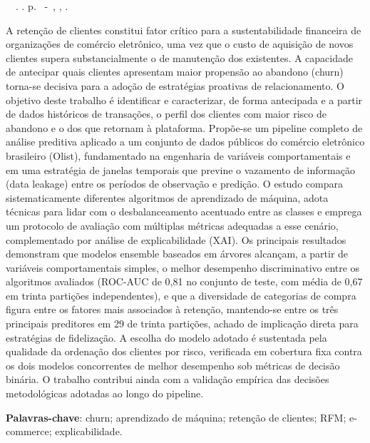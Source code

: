 \setlength{\absparsep}{18pt} %
\begin{resumo}
	\begin{flushleft}
			\setlength{\absparsep}{0pt}
			\SingleSpacing
			\imprimirautorabr~~\textbf{\imprimirtituloresumo}.	\imprimirdata. \pageref{LastPage} p.
			\imprimirtipotrabalho~-~\imprimirinstituicao, \imprimirlocal, \imprimirdata.
	\end{flushleft}
\OnehalfSpacing

A retenção de clientes constitui fator crítico para a sustentabilidade financeira de organizações de comércio eletrônico, uma vez que o custo de aquisição de novos clientes supera substancialmente o de manutenção dos existentes. A capacidade de antecipar quais clientes apresentam maior propensão ao abandono (churn) torna-se decisiva para a adoção de estratégias proativas de relacionamento. O objetivo deste trabalho é identificar e caracterizar, de forma antecipada e a partir de dados históricos de transações, o perfil dos clientes com maior risco de abandono e o dos que retornam à plataforma. Propõe-se um pipeline completo de análise preditiva aplicado a um conjunto de dados públicos do comércio eletrônico brasileiro (Olist), fundamentado na engenharia de variáveis comportamentais e em uma estratégia de janelas temporais que previne o vazamento de informação (data leakage) entre os períodos de observação e predição. O estudo compara sistematicamente diferentes algoritmos de aprendizado de máquina, adota técnicas para lidar com o desbalanceamento acentuado entre as classes e emprega um protocolo de avaliação com múltiplas métricas adequadas a esse cenário, complementado por análise de explicabilidade (XAI). Os principais resultados demonstram que modelos ensemble baseados em árvores alcançam, a partir de variáveis comportamentais simples, o melhor desempenho discriminativo entre os algoritmos avaliados (ROC-AUC de 0,81 no conjunto de teste, com média de 0,67 em trinta partições independentes), e que a diversidade de categorias de compra figura entre os fatores mais associados à retenção, mantendo-se entre os três principais preditores em 29 de trinta partições, achado de implicação direta para estratégias de fidelização. A escolha do modelo adotado é sustentada pela qualidade da ordenação dos clientes por risco, verificada em cobertura fixa contra os dois modelos concorrentes de melhor desempenho sob métricas de decisão binária. O trabalho contribui ainda com a validação empírica das decisões metodológicas adotadas ao longo do pipeline.

	\vspace{\onelineskip}

	\noindent
	\textbf{Palavras-chave}: churn; aprendizado de máquina; retenção de clientes; RFM; e-commerce; explicabilidade.
\end{resumo}
